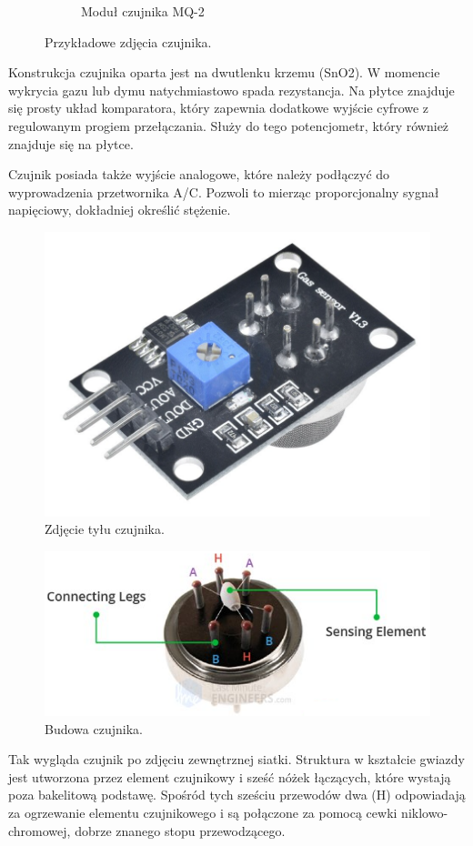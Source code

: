 \documentclass[11pt, a4paper]{article}
\begin{document}
\begin{figure}[h]
\begin{subfigure}{.5\textwidth}
  \caption{Moduł czujnika MQ-2 \cite{fot2}}
  \label{fig:sub2}
\end{subfigure}
\caption{Przykładowe zdjęcia czujnika.}
\label{fig:test}
\end{figure}
\vspace{0.5cm}

Konstrukcja czujnika oparta jest na dwutlenku krzemu (SnO2). W momencie wykrycia gazu lub dymu natychmiastowo spada rezystancja. Na płytce znajduje się prosty układ komparatora, który zapewnia dodatkowe wyjście cyfrowe z regulowanym progiem przełączania. Służy do tego potencjometr, który również znajduje się na płytce.

Czujnik posiada także wyjście analogowe, które należy podłączyć do wyprowadzenia przetwornika A/C. Pozwoli to mierząc proporcjonalny sygnał napięciowy, dokładniej określić stężenie.


\begin{figure}[h]
\centering
\includegraphics[width=.6\linewidth]{fig/element/backfot.png}
\caption{Zdjęcie tyłu czujnika.\cite{fot3}}
\label{fig:test}
\end{figure}
\vspace{0.5cm}



\newpage
\begin{figure}[h]
\centering
\includegraphics[width=.7\linewidth]{fig/element/infot.png}
\caption{Budowa czujnika.\cite{fot2}}
\label{fig:test}
\end{figure}
\vspace{0.5cm}
Tak wygląda czujnik po zdjęciu zewnętrznej siatki. Struktura w kształcie gwiazdy jest utworzona przez element czujnikowy i sześć nóżek łączących, które wystają poza bakelitową podstawę. Spośród tych sześciu przewodów dwa (H) odpowiadają za ogrzewanie elementu czujnikowego i są połączone za pomocą cewki niklowo-chromowej, dobrze znanego stopu przewodzącego.\\
\end{document}
